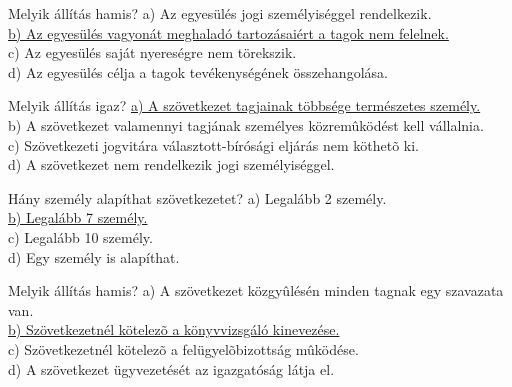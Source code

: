 \begin{frame}


\begin{tcolorbox}[title={79. Kérdés}]
Melyik állítás hamis?
\tcblower
a) Az egyesülés jogi személyiséggel rendelkezik.\\
\uline {b) Az egyesülés vagyonát meghaladó tartozásaiért a tagok nem felelnek.}\\
c) Az egyesülés saját nyereségre nem törekszik.\\
d) Az egyesülés célja a tagok tevékenységének összehangolása.
\end{tcolorbox}

\begin{tcolorbox}[title={80. Kérdés}]
Melyik állítás igaz?
\tcblower
\uline {a) A szövetkezet tagjainak többsége természetes személy.}\\
b) A szövetkezet valamennyi tagjának személyes közremûködést kell vállalnia.\\
c) Szövetkezeti jogvitára választott-bírósági eljárás nem köthetõ ki.\\
d) A szövetkezet nem rendelkezik jogi személyiséggel.
\end{tcolorbox}

\begin{tcolorbox}[title={81. Kérdés}]
Hány személy alapíthat szövetkezetet?
\tcblower
a) Legalább 2 személy.\\
\uline {b) Legalább 7 személy.}\\
c) Legalább 10 személy.\\
d) Egy személy is alapíthat.
\end{tcolorbox}

\begin{tcolorbox}[title={82. Kérdés}]
Melyik állítás hamis?
\tcblower
a) A szövetkezet közgyûlésén minden tagnak egy szavazata van.\\
\uline {b) Szövetkezetnél kötelezõ a könyvvizsgáló kinevezése.}\\
c) Szövetkezetnél kötelezõ a felügyelõbizottság mûködése. \\
d) A szövetkezet ügyvezetését az igazgatóság látja el.
\end{tcolorbox}

\end{frame}


